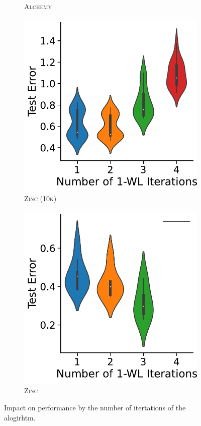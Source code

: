 \begin{figure}[!b]
\begin{subfigure}[b]{0.19\textwidth}
        \caption{\scriptsize\textsc{Alchemy}}
	\end{subfigure}
	\hfill
	\begin{subfigure}[b]{0.19\textwidth}
		\centering
		\includegraphics[width=\textwidth]{Figures/k_wl_violin_Zinc 10k.pdf}
        \caption{\scriptsize\textsc{Zinc (10k)}}
	\end{subfigure}
	\hfill
	\begin{subfigure}[b]{0.19\textwidth}
		\centering
		\includegraphics[width=\textwidth]{Figures/k_wl_violin_Zinc.pdf}
        \caption{\scriptsize\textsc{Zinc}}
	\end{subfigure}
	\caption{Impact on performance by the number of itertations of the \wl alogirhtm.}
	\label{fig:k_wl_dependence}
\end{figure}

